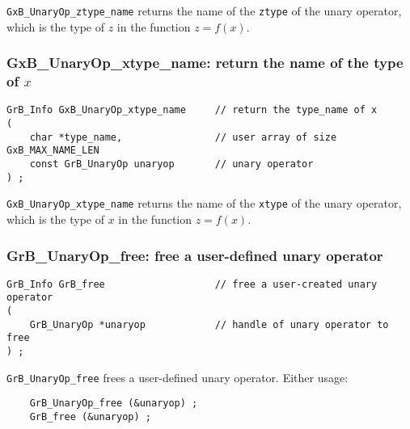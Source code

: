 \documentclass[12pt]{article}
\begin{document}
\verb'GxB_UnaryOp_ztype_name' returns the name of the \verb'ztype' of the unary
operator, which is the type of $z$ in the function $z=f(x)$.

\subsubsection{{\sf GxB\_UnaryOp\_xtype\_name:} return the name of the type of $x$}
\label{unaryop_xtype_name}

\begin{mdframed}[userdefinedwidth=6in]
{\footnotesize
\begin{verbatim}
GrB_Info GxB_UnaryOp_xtype_name     // return the type_name of x
(
    char *type_name,                // user array of size GxB_MAX_NAME_LEN
    const GrB_UnaryOp unaryop       // unary operator
) ;
\end{verbatim}
}\end{mdframed}

\verb'GxB_UnaryOp_xtype_name' returns the name of the \verb'xtype' of the unary
operator, which is the type of $x$ in the function $z=f(x)$.

\subsubsection{{\sf GrB\_UnaryOp\_free:} free a user-defined unary operator}
\label{unaryop_free}

\begin{mdframed}[userdefinedwidth=6in]
{\footnotesize
\begin{verbatim}
GrB_Info GrB_free                   // free a user-created unary operator
(
    GrB_UnaryOp *unaryop            // handle of unary operator to free
) ;
\end{verbatim}
}\end{mdframed}

\verb'GrB_UnaryOp_free' frees a user-defined unary operator.
Either usage:

    {\small
    \begin{verbatim}
    GrB_UnaryOp_free (&unaryop) ;
    GrB_free (&unaryop) ; \end{verbatim}}
\end{document}

